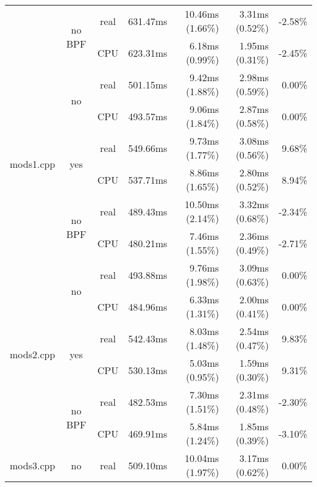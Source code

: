 \documentclass[en]{pracamgr}
\begin{document}
\begin{small}
\begin{longtable}{|l|c|c|r|r|r|r|}
                            \cline{2-7}
                            & \multirow{2}{*}{no BPF} & real & 631.47ms & 10.46ms (1.66\%) & 3.31ms (0.52\%) & -2.58\% \\*
                            &                         & CPU  & 623.31ms & 6.18ms (0.99\%) & 1.95ms (0.31\%) & -2.45\% \\
\hline
\multirow{6}{*}{mods1.cpp}  & \multirow{2}{*}{no}     & real & 501.15ms & 9.42ms (1.88\%) & 2.98ms (0.59\%) & 0.00\% \\*
                            &                         & CPU  & 493.57ms & 9.06ms (1.84\%) & 2.87ms (0.58\%) & 0.00\% \\*
                            \cline{2-7}
                            & \multirow{2}{*}{yes}    & real & 549.66ms & 9.73ms (1.77\%) & 3.08ms (0.56\%) & 9.68\% \\*
                            &                         & CPU  & 537.71ms & 8.86ms (1.65\%) & 2.80ms (0.52\%) & 8.94\% \\*
                            \cline{2-7}
                            & \multirow{2}{*}{no BPF} & real & 489.43ms & 10.50ms (2.14\%) & 3.32ms (0.68\%) & -2.34\% \\*
                            &                         & CPU  & 480.21ms & 7.46ms (1.55\%) & 2.36ms (0.49\%) & -2.71\% \\
\hline
\multirow{6}{*}{mods2.cpp}  & \multirow{2}{*}{no}     & real & 493.88ms & 9.76ms (1.98\%) & 3.09ms (0.63\%) & 0.00\% \\*
                            &                         & CPU  & 484.96ms & 6.33ms (1.31\%) & 2.00ms (0.41\%) & 0.00\% \\*
                            \cline{2-7}
                            & \multirow{2}{*}{yes}    & real & 542.43ms & 8.03ms (1.48\%) & 2.54ms (0.47\%) & 9.83\% \\*
                            &                         & CPU  & 530.13ms & 5.03ms (0.95\%) & 1.59ms (0.30\%) & 9.31\% \\*
                            \cline{2-7}
                            & \multirow{2}{*}{no BPF} & real & 482.53ms & 7.30ms (1.51\%) & 2.31ms (0.48\%) & -2.30\% \\*
                            &                         & CPU  & 469.91ms & 5.84ms (1.24\%) & 1.85ms (0.39\%) & -3.10\% \\
\hline
\multirow{6}{*}{mods3.cpp}  & \multirow{2}{*}{no}     & real & 509.10ms & 10.04ms (1.97\%) & 3.17ms (0.62\%) & 0.00\% \\*

\end{longtable}
\end{small}
\end{document}
